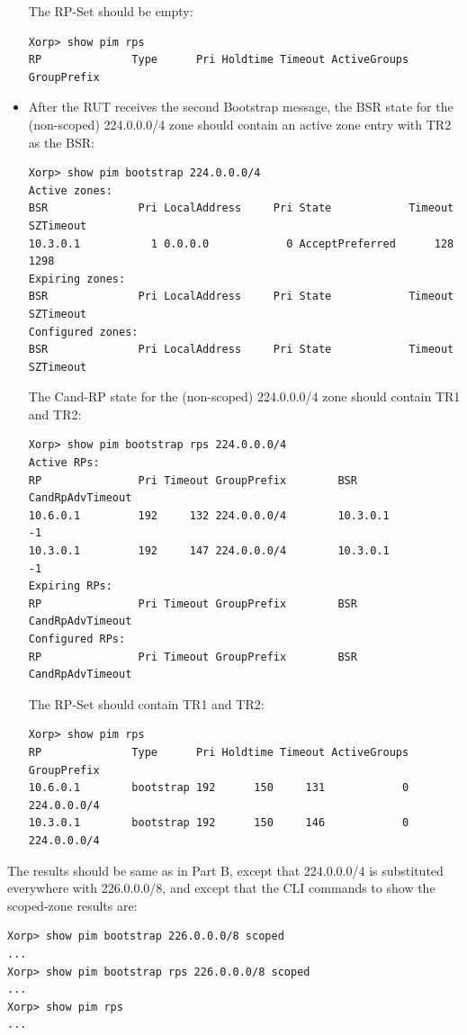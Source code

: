 \documentclass[11pt]{report}
\begin{document}
\begin{itemize}
  The RP-Set should be empty:

\begin{verbatim}
Xorp> show pim rps 
RP              Type      Pri Holdtime Timeout ActiveGroups GroupPrefix       
\end{verbatim}

  \item After the RUT receives the second Bootstrap message, the BSR state for
  the (non-scoped) 224.0.0.0/4 zone should contain an active zone entry with
  TR2 as the BSR:

\begin{verbatim}
Xorp> show pim bootstrap 224.0.0.0/4
Active zones:
BSR              Pri LocalAddress     Pri State            Timeout SZTimeout
10.3.0.1           1 0.0.0.0            0 AcceptPreferred      128      1298
Expiring zones:
BSR              Pri LocalAddress     Pri State            Timeout SZTimeout
Configured zones:
BSR              Pri LocalAddress     Pri State            Timeout SZTimeout
\end{verbatim}

  The Cand-RP state for the (non-scoped) 224.0.0.0/4 zone should contain TR1
  and TR2:

\begin{verbatim}
Xorp> show pim bootstrap rps 224.0.0.0/4
Active RPs:
RP               Pri Timeout GroupPrefix        BSR         CandRpAdvTimeout
10.6.0.1         192     132 224.0.0.0/4        10.3.0.1                  -1
10.3.0.1         192     147 224.0.0.0/4        10.3.0.1                  -1
Expiring RPs:
RP               Pri Timeout GroupPrefix        BSR         CandRpAdvTimeout
Configured RPs:
RP               Pri Timeout GroupPrefix        BSR         CandRpAdvTimeout
\end{verbatim}

  The RP-Set should contain TR1 and TR2:

\begin{verbatim}
Xorp> show pim rps 
RP              Type      Pri Holdtime Timeout ActiveGroups GroupPrefix       
10.6.0.1        bootstrap 192      150     131            0 224.0.0.0/4       
10.3.0.1        bootstrap 192      150     146            0 224.0.0.0/4       
\end{verbatim}

\end{itemize}


The results should be same as in Part B, except that 224.0.0.0/4 is
substituted everywhere with 226.0.0.0/8, and except that
the CLI commands to show the scoped-zone results are:
\begin{verbatim}
Xorp> show pim bootstrap 226.0.0.0/8 scoped
...
Xorp> show pim bootstrap rps 226.0.0.0/8 scoped
...
Xorp> show pim rps 
...
\end{verbatim}
\end{document}
